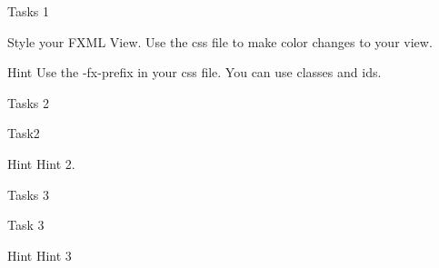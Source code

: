 \begin{frame}{Tasks 1}
\begin{block}
Style your FXML View. Use the css file to make color changes to your view. 
\end{block}
\pause
\begin{exampleblock}{Hint}
Use the -fx-prefix in your css file. You can use classes and ids. 
\end{exampleblock}
\end{frame}
\begin{frame}{Tasks 2}

\begin{block}
Task2 
\end{block}
\pause
\begin{exampleblock}{Hint}
Hint 2. 
\end{exampleblock}
\end{frame}
\begin{frame}{Tasks 3}
\begin{block}
Task 3
\end{block}
\pause
\begin{exampleblock}{Hint}
Hint 3 
\end{exampleblock}
\end{frame}